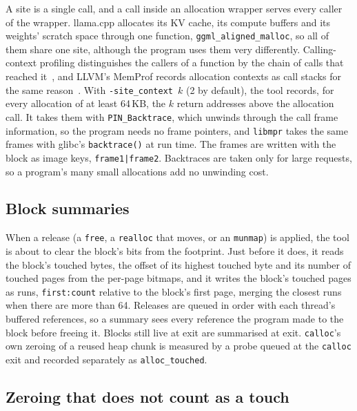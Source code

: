 \documentclass[11pt]{article}
\newcommand{\libmpr}{\texttt{libmpr}}
\begin{document}
A site is a single call, and a call inside an allocation wrapper serves every caller of the wrapper. llama.cpp
allocates its KV cache, its compute buffers and its weights' scratch space through one function,
\texttt{ggml\_aligned\_malloc}, so all of them share one site, although the program uses them very differently.
Calling-context profiling distinguishes the callers of a function by the chain of calls that reached
it~\cite{Ammons1997CCT,Bond2007PCC}, and LLVM's MemProf records allocation contexts as call stacks for the same
reason~\cite{MemProf}. With \texttt{-site\_context}~$k$ (2 by default), the tool records, for every allocation of
at least 64\,KB, the $k$ return addresses above the allocation call. It takes them with \texttt{PIN\_Backtrace},
which unwinds through the call frame information, so the program needs no frame pointers, and \libmpr{} takes
the same frames with glibc's \texttt{backtrace()} at run time. The frames are written with the block as image
keys, \texttt{frame1|frame2}. Backtraces are taken only for large requests, so a program's many small
allocations add no unwinding cost.

\subsection{Block summaries}

When a release (a \texttt{free}, a \texttt{realloc} that moves, or an \texttt{munmap}) is applied, the tool is
about to clear the block's bits from the footprint. Just before it does, it reads the block's touched bytes, the
offset of its highest touched byte and its number of touched pages from the per-page bitmaps, and it writes the
block's touched pages as runs, \texttt{first:count} relative to the block's first page, merging the closest runs
when there are more than 64. Releases are queued in order with each thread's buffered references, so a summary
sees every reference the program made to the block before freeing it. Blocks still live at exit are summarised
at exit. \texttt{calloc}'s own zeroing of a reused heap chunk is measured by a probe queued at the
\texttt{calloc} exit and recorded separately as \texttt{alloc\_touched}.

\subsection{Zeroing that does not count as a touch}
\end{document}
